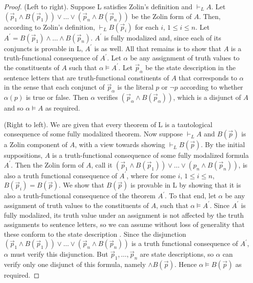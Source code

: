 \begin{proof}
(Left to right). Suppose L satisfies Zolin's definition and $\vdash_L A$. Let $(\vec{p}_1\wedge B(\vec{p}_1))\vee {\ldots}\vee (\vec{p}_n\wedge B(\vec{p}_n))$ be the Zolin form of $A$. Then, according to Zolin's definition, $\vdash_L B(\vec{p}_i)$ for each $i$, $1\le i\le n$. Let $A^\prime = B(\vec{p}_1)\wedge {\ldots}\wedge B(\vec{p}_n)$. $A^\prime$ is fully modalized and, since each of its conjuncts is provable in L, $A^\prime$ is as well. All that remains is to show that $A$ is a truth-functional consequence of $A^\prime$. Let $\alpha$ be any assignment of truth values to the constituents of $A$ such that $\alpha\models A^\prime$. Let $\vec{p}_\alpha$ be the state description in the sentence letters that are truth-functional constiuents of $A$ that corresponds to $\alpha$ in the sense that each conjunct of $\vec{p}_\alpha$ is the literal $p$ or $\neg p$ according to whether $\alpha(p)$ is true or false. Then $\alpha$ verifies $(\vec{p}_\alpha \wedge B(\vec{p}_\alpha))$, which is a disjunct of $A$ and so $\alpha\models A$ as required.

(Right to left). We are given that every theorem of L is a tautological consequence of some fully modalized theorem. Now suppose $\vdash_L A$ and $B(\vec{p})$ is a Zolin component of $A$, with a view towards showing $\vdash_L B(\vec{p})$. By the initial suppositions, $A$ is a truth-functional consequence of some fully modalized formula $A^\prime$. Then the Zolin form of $A$, call it $(\vec{p}_1\wedge B(\vec{p}_1))\vee {\ldots}\vee (p_n\wedge B(\vec{p}_n))$, is also a truth functional consequence of $A^\prime$, where for some $i$, $1\le i\le n$, $B(\vec{p}_i)=B(\vec{p})$. We show that $B(\vec{p})$ is provable in L by showing that it is also a truth-functional consequence of the theorem $A^\prime$. To that end, let $\alpha$ be any assignment of truth values to the constituents of $A$, such that $\alpha\models A^\prime$. Since $A^\prime$ is fully modalized, its truth value under an assignment is not affected by the truth assignments to sentence letters, so we can assume without loss of generality that these conform to the state description . Since the disjunction $(\vec{p}_1\wedge B(\vec{p}_1))\vee {\ldots}\vee (\vec{p}_n\wedge B(\vec{p}_n))$ is a truth functional consequence of $A^\prime$, $\alpha$ must verify this disjunction. But $\vec{p}_1,{\ldots},\vec{p}_n$ are state descriptions, so $\alpha$ can verify only one disjunct of this formula, namely $\wedge B(\vec{p})$. Hence $\alpha\models B(\vec{p})$ as required.
\end{proof}

